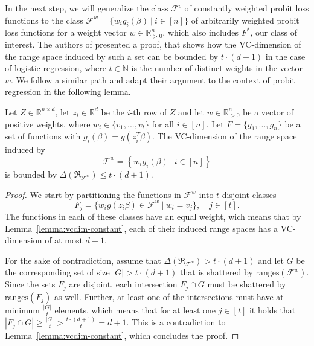 In the next step, we will generalize the class $\mathcal{F}^c$
of constantly weighted probit loss functions to the class
$\mathcal{F}^w = \{w_ig_i(\beta)\ |\ i \in [n]\}$ of arbitrarily
weighted probit loss functions for a weight vector
$w \in \mathbb{R}^n_{>0}$, which also includes $F^\ast$,
our class of interest.
The authors of \cite{on-coresets} presented a proof, that shows
how the VC-dimension of the range space induced by such a
set can be bounded by $t\cdot(d+1)$ in the case of logistic
regression, where $t \in \mathbb{N}$ is the number of distinct
weights in the vector $w$.
We follow a similar path and adapt their argument to the
context of probit regression in the following lemma.

\begin{lemma}
    \label{lemma:vcdim-arbitrary}
    Let $Z \in \mathbb{R}^{n \times d}$, let $z_i \in \mathbb{R}^d$ be the
    $i$-th row of $Z$ and let
    $w \in \mathbb{R}^n_{>0}$ be a vector of positive weights,
    where $w_i \in \{ v_1, ..., v_t \}$ for all $i \in [n]$.
    Let $F = \{g_1, ..., g_n\}$ be a set of functions with
    $g_i(\beta) = g(z_i^T \beta)$.
    The VC-dimension of the range space induced by
    \begin{equation*}
        \mathcal{F}^w = \left\{ w_ig_i(\beta) \ |\ i \in [n] \right\}
    \end{equation*}
    is bounded by
    $\Delta(\mathfrak{R}_{\mathcal{F}^w}) \leq t \cdot (d + 1)$.
\end{lemma}
\begin{proof}
    We start by partitioning the functions in
    $\mathcal{F}^w$ into $t$ disjoint classes
    \begin{equation*}
        F_j = \{ w_ig(z_i\beta) \in \mathcal{F}^w \
        |\ w_i = v_j \},\quad j \in [t].
    \end{equation*}
    The functions in each of these classes have an equal
    weight, wich means that by Lemma~\ref{lemma:vcdim-constant}, each of
    their induced range spaces has a VC-dimension of at most $d+1$.

    For the sake of contradiction, assume that
    $\Delta(\mathfrak{R}_{\mathcal{F}^w}) > t \cdot (d + 1)$ and let
    $G$ be the corresponding set of size $|G| > t \cdot (d + 1)$ that
    is shattered by $\text{ranges}(\mathcal{F}^w)$.
    Since the sets $F_j$ are disjoint, each intersection
    $F_j \cap G$ must be shattered by $\text{ranges}(F_j)$ as well.
    Further, at least one of the intersections must have at minimum
    $\frac{|G|}{t}$ elements, which means that for at least one $j \in [t]$
    it holds that
    $|F_j \cap G| \geq \frac{|G|}{t} > \frac{t \cdot (d+1)}{t} = d + 1$.
    This is a contradiction to Lemma~\ref{lemma:vcdim-constant}, which
    concludes the proof.
\end{proof}

